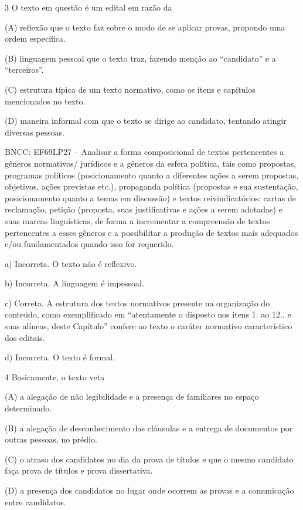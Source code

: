 \begin{itemize}
\begin{itemize}
{\begin{itemize}
\begin{itemize}
\begin{escolha}
\begin{escolha}
\begin{escolha}
\begin{escolha}
\begin{escolha}
\num{3} O texto em questão é um edital em razão da

(A) reflexão que o texto faz sobre o modo de se aplicar provas, propondo
uma ordem específica.

(B) linguagem pessoal que o texto traz, fazendo menção ao ``candidato''
e a ``terceiros''.

(C) estrutura típica de um texto normativo, como os itens e capítulos
mencionados no texto.

(D) maneira informal com que o texto se dirige ao candidato, tentando
atingir diversas pessoas.

BNCC: EF69LP27 -- Analisar a forma composicional de textos pertencentes
a gêneros normativos/ jurídicos e a gêneros da esfera política, tais
como propostas, programas políticos (posicionamento quanto a diferentes
ações a serem propostas, objetivos, ações previstas etc.), propaganda
política (propostas e sua sustentação, posicionamento quanto a temas em
discussão) e textos reivindicatórios: cartas de reclamação, petição
(proposta, suas justificativas e ações a serem adotadas) e suas marcas
linguísticas, de forma a incrementar a compreensão de textos
pertencentes a esses gêneros e a possibilitar a produção de textos mais
adequados e/ou fundamentados quando isso for requerido.

a) Incorreta. O texto não é reflexivo.

b) Incorreta. A linguagem é impessoal.

c) Correta. A estrutura dos textos normativos presente na organização do
conteúdo, como exemplificado em ``atentamente o disposto nos itens 1. ao
12., e suas alíneas, deste Capítulo'' confere ao texto o caráter
normativo característico dos editais.

d) Incorreta. O texto é formal.

\num{4} Basicamente, o texto veta

(A) a alegação de não legibilidade e a presença de familiares no espaço
determinado.

(B) a alegação de desconhecimento das cláusulas e a entrega de
documentos por outras pessoas, no prédio.

(C) o atraso dos candidatos no dia da prova de títulos e que o mesmo
candidato faça prova de títulos e prova dissertativa.

(D) a presença dos candidatos no lugar onde ocorrem as provas e a
comunicação entre candidatos.


\end{escolha}
\end{escolha}
\end{escolha}
\end{escolha}
\end{escolha}
\end{itemize}
\end{itemize}}
\end{itemize}
\end{itemize}

